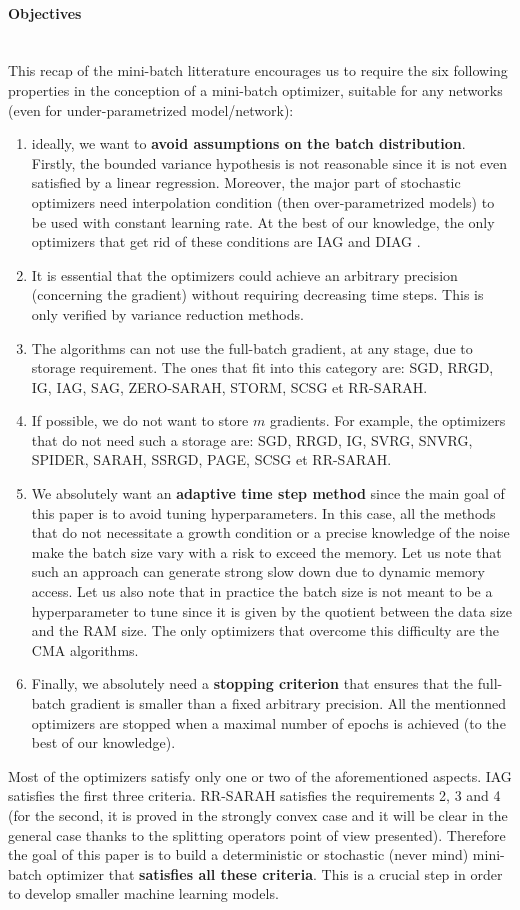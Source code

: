 \paragraph{Objectives}
~~\\
This recap of the mini-batch litterature encourages us to require the six following properties in the conception of a mini-batch optimizer, suitable for any networks (even for under-parametrized model/network):
\begin{enumerate}
	\item ideally, we want to \textbf{avoid assumptions on the batch distribution}. Firstly, the bounded variance hypothesis is not reasonable 
          since it is not even satisfied by a linear regression. Moreover, the major part of stochastic optimizers need interpolation condition (then over-parametrized models) to be used with constant learning rate. At the best of our knowledge, the only optimizers that get rid of these conditions are IAG and DIAG \cite{DIAG}.
	\item It is essential that the optimizers could achieve an arbitrary precision (concerning the gradient) without requiring decreasing time steps. This is only verified by variance reduction methods. 
	\item The algorithms can not use the full-batch gradient, at any stage, due to storage requirement. The ones that fit into this category are: SGD, RRGD, IG, IAG, SAG, ZERO-SARAH, STORM, SCSG et RR-SARAH.
	\item If possible, we do not want to store $m$ gradients. For example, the optimizers that do not need such a storage are:  SGD, RRGD, IG, SVRG, SNVRG, SPIDER, SARAH, SSRGD, PAGE, SCSG et RR-SARAH.
	\item We absolutely want an \textbf{adaptive time step method} since the main goal of this paper is to avoid tuning hyperparameters. In this case, all the methods that do not necessitate a growth condition or a precise knowledge of the noise make the batch size vary with a risk to exceed the memory. Let us note that such an approach can generate strong slow down due to dynamic memory access. Let us also note that in practice the batch size is not meant to be a hyperparameter to tune since it is given by the quotient between the data size and the RAM size. The only optimizers that overcome this difficulty are the CMA algorithms. 
	\item Finally, we absolutely need a \textbf{stopping criterion} that ensures that the full-batch gradient is smaller than a fixed arbitrary precision. All the mentionned
          optimizers are stopped when a maximal number of epochs is achieved (to the best of our knowledge). 
\end{enumerate}
Most of the optimizers satisfy only one or two of the aforementioned aspects. IAG satisfies the first three criteria. RR-SARAH satisfies the requirements 2, 3 and 4 (for the second, it is proved in the strongly convex case and it will be clear in the general case thanks to the splitting operators point of view presented). Therefore the goal of this paper is to build a deterministic or stochastic (never mind) mini-batch optimizer that \textbf{satisfies all these criteria}. This is a crucial step in order to develop smaller machine learning models. 

